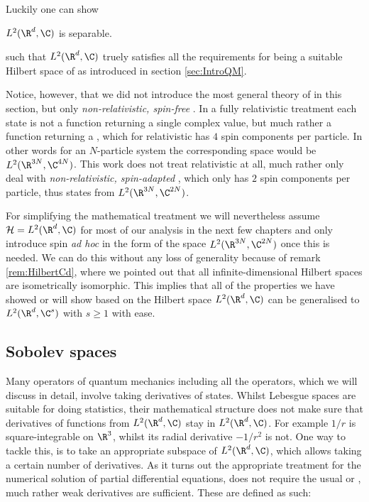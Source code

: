 \noindent
Luckily one can show~
\begin{prop}
	$L^2(\R^d, \C)$ is separable.
\end{prop}
\noindent
such that $L^2(\R^d, \C)$ truely satisfies all the requirements
for being a suitable Hilbert space of \QM
as introduced in section \vref{sec:IntroQM}.

Notice, however, that we did not  introduce the most general theory of \QM
in this section, but only  \emph{non-relativistic, spin-free} \QM.
In a fully relativistic \QM treatment
each state is not a function returning
a single complex value, but much rather a function returning a ,
which for relativistic \QM has $4$ spin components per particle.
In other words for an $N$-particle system
the corresponding space would be $L^2(\R^{3N}, \C^{4N})$.
This work does not treat relativistic \QM at all,
much rather only deal with \textit{non-relativistic, spin-adapted} \QM,
which only has $2$ spin components per particle,
thus states from $L^2(\R^{3N}, \C^{2N})$.

For simplifying the mathematical treatment we will nevertheless
assume $\hilbert = L^2(\R^d, \C)$ for most of our analysis
in the next few chapters and only introduce spin \textit{ad hoc} in the form
of the space $L^2(\R^{3N}, \C^{2N})$ once this is needed.
We can do this without any loss of generality
because of remark \vref{rem:HilbertCd},
where we pointed out that all infinite-dimensional
Hilbert spaces are isometrically isomorphic.
This implies that all of the properties we have showed or will show based
on the Hilbert space $L^2(\R^d, \C)$ can be generalised
to $L^2(\R^d, \C^s)$ with $s \geq 1$ with ease.

\subsection{Sobolev spaces}
\label{sec:Sobolev}
Many operators of quantum mechanics including all the operators,
which we will discuss in detail, involve taking derivatives of states.
Whilst Lebesgue spaces are suitable for doing statistics,
their mathematical structure does not make sure
that derivatives of functions from $L^2(\R^d, \C)$ stay in $L^2(\R^d, \C)$.
For example $1/r$ is square-integrable on $\R^3$,
whilst its radial derivative $-1/r^2$ is not.
One way to tackle this, is to take an appropriate subspace of $L^2(\R^d, \C)$,
which allows taking a certain number of derivatives.
As it turns out the appropriate treatment for the numerical solution
of partial differential equations,
does not require the usual or ,
much rather weak derivatives are sufficient.
These are defined as such:

